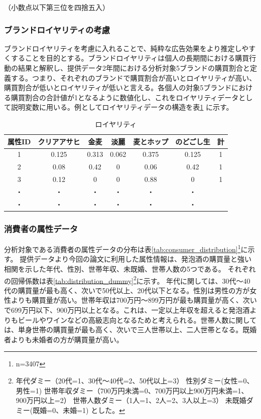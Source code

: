 \documentclass[11pt]{jsarticle}
\begin{document}
（小数点以下第三位を四捨五入）

\subsubsection{ブランドロイヤリティの考慮}
\label{subsec:royality}
ブランドロイヤリティを考慮に入れることで、純粋な広告効果をより推定しやすくすることを目的とする。ブランドロイヤリティは個人の長期間における購買行動の結果と解釈し、提供データ2年間における分析対象5ブランドの購買割合と定義する。つまり、それぞれのブランドで購買割合が高いとロイヤリティが高い、購買割合が低いとロイヤリティが低いと言える。各個人の対象5ブランドにおける購買割合の合計値が1となるように数値化し、これをロイヤリティデータとして説明変数に用いる。例としてロイヤリティデータの構造を表\ref{tab:royality_ex} に示す。

\begin{table}[htbp]
  \centering
  \caption{ロイヤリティ}
\begin{center}
 \begin{tabular}{c|ccccc|c} \hline
   属性ID & クリアアサヒ & 金麦 & 淡麗 & 麦とホップ & のどごし生 & 計 \\ \hline
   1 & 0.125 & 0.313 & 0.062 & 0.375 & 0.125 & 1 \\
   2 & 0.08 & 0.42 & 0 & 0.06 & 0.42 & 1 \\
   3 & 0.12 & 0 & 0 & 0.88 & 0 & 1 \\
   ・ & ・ & ・ & ・ & ・ & ・ & \\
   ・ & ・ & ・ & ・ & ・ & ・ & \\  
  \end{tabular}
  \label{tab:royality_ex}
 \end{center}
\end{table}

\subsubsection{消費者の属性データ}
\label{subsec:consumer_distribution}
分析対象である消費者の属性データの分布は表\ref{tab:consumer_distribution}\footnote{n=3407}に示す。
提供データより今回の論文に利用した属性情報は、発泡酒の購買量と強い相関を示した年代、性別、世帯年収、未既婚、世帯人数の5つである。
それぞれの回帰係数は表\ref{tab:distribution_dummy}\footnote{年代ダミー（20代=1、30代〜40代=2、50代以上=3）
性別ダミー(女性=0、男性=1)
世帯年収ダミー（700万円未満=0、700万円以上900万円未満=1、900万円以上=2）
世帯人数ダミー（1人=1、2人=2、3人以上=3）
未既婚ダミー(既婚=0、未婚=1)
とした。}に示す。
年代に関しては、30代〜40代の購買量が最も高く、次いで50代以上、20代以下となる。性別は男性の方が女性よりも購買量が高い。世帯年収は700万円〜899万円が最も購買量が高く、次いで699万円以下、900万円以上となる。これは、一定以上年収を超えると発泡酒よりもビールやワインなどの高級志向となるためと考えられる。世帯人数に関しては、単身世帯の購買量が最も高く、次いで三人世帯以上、二人世帯となる。既婚者よりも未婚者の方が購買量が高い。
\end{document}

